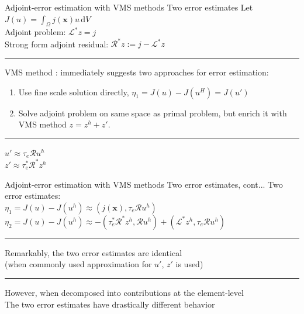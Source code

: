 \documentclass[fleqn]{beamer}
\newcommand{\bs}[1]{\boldsymbol{#1}}
\begin{document}

\begin{frame}{Adjoint-error estimation with VMS methods}
{Two error estimates}
Let $J(u) = \int_{\Omega} j(\bs{x}) u \, \text{d} V$ \\
Adjoint problem: $\mathcal{L}^* z = j$ \\
Strong form adjoint residual: $\mathcal{R}^*z := j - \mathcal{L}^*z$ \\ [8pt]
\hrule
\vspace{1em}
VMS method : immediately suggests two approaches for error estimation:
\begin{enumerate}
\item Use fine scale solution directly, $\eta_1 = J(u) - J(u^H) = J(u')$
\item Solve adjoint problem on same space as primal problem,
but enrich it with VMS method $z = z^h + z'$.
\end{enumerate}
\vspace{0.5em}
\hrule
\vspace{1em}
$u' \approx \tau_e \mathcal{R} u^h$ \\
$z' \approx \tau^*_e \mathcal{R}^* z^h$ \\
\end{frame}


\begin{frame}{Adjoint-error estimation with VMS methods}
{Two error estimates, cont...}
Two error estimates: \\ [4pt]
$\eta_1 = J(u) - J(u^h) \approx (j(\bs{x}),  \tau_e \mathcal{R} u^h)$ \\ [4pt]
$\eta_2 = J(u) - J(u^h) \approx -(\tau_e^* \mathcal{R}^* z^h, \mathcal{R} u^h) + 
(\mathcal{L}^* z^h, \tau_e \mathcal{R} u^h)$ \\ [8pt]
\hrule
\vspace{1em}
Remarkably, the two error estimates are identical \\
(when commonly used approximation for $u'$, $z'$ is used) \\ [8pt]
\hrule
\vspace{1em}
However, when decomposed into contributions at the element-level \\
The two error estimates have drastically different behavior
\end{frame}
\end{document}
